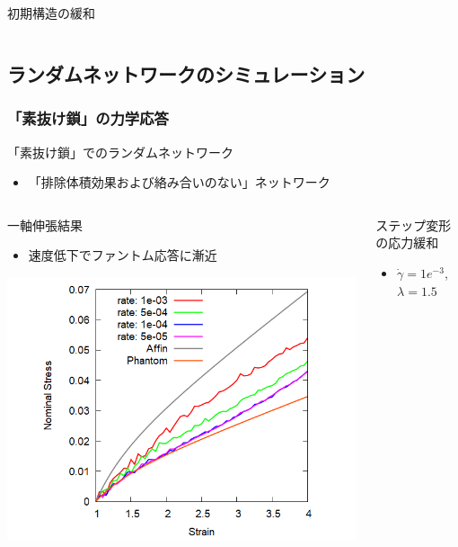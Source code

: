 \documentclass[aspectratio=169,11pt, dvipdfmx]{beamer}
\begin{document}
\begin{frame}
\begin{exampleblock}{初期構造の緩和}
\begin{columns}[T, onlytextwidth]
		\end{columns}
    \end{exampleblock}
\end{frame}

\subsection{ランダムネットワークのシミュレーション}
\begin{frame}
	\frametitle{「素抜け鎖」の力学応答}
		\begin{alertblock}{「素抜け鎖」でのランダムネットワーク}
			\begin{itemize}
				\item \alert{「排除体積効果および絡み合いのない」}ネットワーク
			\end{itemize}
        \end{alertblock}
        \vspace{-3mm}
		\begin{columns}[totalwidth=\linewidth]
				\begin{block}{一軸伸張結果}
					\begin{itemize}
						\item 速度低下で\alert{ファントム応答}に漸近
                    \end{itemize}
                    \centering
                        \includegraphics[width=.75\columnwidth]{N48_sunuke.png}
				\end{block}
				\begin{exampleblock}{ステップ変形の応力緩和}
                    \begin{itemize}
                        \item $\dot{\gamma} = 1e^{-3}$, $\lambda = 1.5$

\end{itemize}
\end{exampleblock}
\end{columns}
\end{frame}
\end{document}
